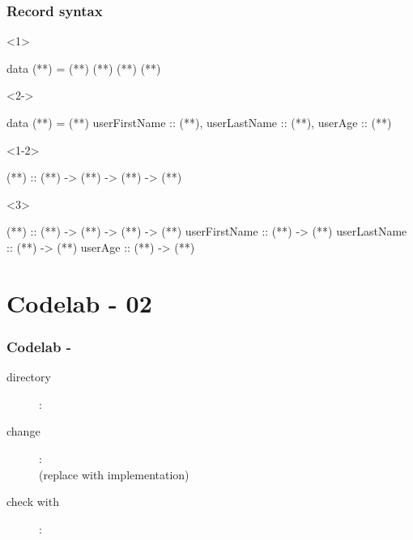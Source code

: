 \documentclass[17pt]{beamer}
\renewcommand{\(}[1]{\begin{columns}[#1]}
\renewcommand{\)}{\end{columns}}
\newcommand{\<}[1]{\begin{column}{#1}}
\renewcommand{\>}{\end{column}}
\begin{document}
\begin{frame}[fragile]
  \frametitle{Record syntax}
  \begin{minipage}[t][0.4\textheight]{\textwidth}
    \begin{onlyenv}<1>
      \begin{code}
data (**) = (**) (**) (**) (**)
      \end{code}
    \end{onlyenv}
    \begin{onlyenv}<2->
      \begin{code}
data (**) = (**) {
  userFirstName :: (**),
  userLastName  :: (**),
  userAge       :: (**)
}
      \end{code}
    \end{onlyenv}
  \end{minipage}
  \begin{onlyenv}<1-2>
    \begin{code}[types]
(**)          :: (**) -> (**) -> (**) -> (**)
    \end{code}
  \end{onlyenv}
  \begin{onlyenv}<3>
    \begin{code}[types]
(**)          :: (**) -> (**) -> (**) -> (**)
userFirstName :: (**) -> (**)
userLastName  :: (**) -> (**)
userAge       :: (**) -> (**)
    \end{code}
  \end{onlyenv}
\end{frame}


\section{Codelab - 02}

\begin{frame}
  \frametitle{Codelab - }
  \begin{description}
    \item[directory]: 
    \item[change]:  \\
      (replace  with implementation)
    \item[check with]: 
  \end{description}
\end{frame}
\end{document}
